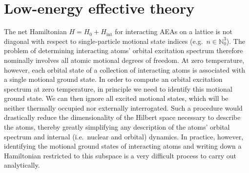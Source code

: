 \documentclass[preprint,showkeys,nofootinbib]{revtex4-1}
\renewcommand{\t}{\text} %
\newcommand{\1}{\mathds{1}}
\begin{document}
\section{Low-energy effective theory}
\label{sec:low_energy}

The net Hamiltonian $H = H_0 + H_{\t{int}}$ for interacting AEAs on a
lattice is not diagonal with respect to single-particle motional state
indices (e.g.~$n\in\mathbb{N}_0^3$).  The problem of determining
interacting atoms' orbital excitation spectrum therefore nominally
involves all atomic motional degrees of freedom.  At zero temperature,
however, each orbital state of a collection of interacting atoms is
associated with a single motional ground state.  In order to compute
an orbital excitation spectrum at zero temperature, in principle we
need to identify this motional ground state.  We can then ignore all
excited motional states, which will be neither thermally occupied nor
externally interrogated.  Such a procedure would drastically reduce
the dimensionality of the Hilbert space necessary to describe the
atoms, thereby greatly simplifying any description of the atoms'
orbital spectrum and internal (i.e.~nuclear and orbital) dynamics.  In
practice, however, identifying the motional ground states of
interacting atoms and writing down a Hamiltonian restricted to this
subspace is a very difficult process to carry out analytically.
\end{document}
